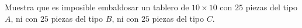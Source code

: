 Muestra que es imposible embaldosar un tablero de $10\times 10$ con $25$ piezas del tipo $A$, ni con $25$ piezas del tipo $B$, ni con $25$ piezas del tipo $C$. 
